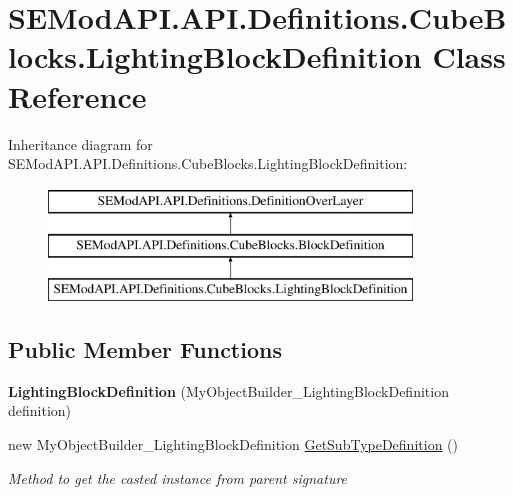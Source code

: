 \hypertarget{class_s_e_mod_a_p_i_1_1_a_p_i_1_1_definitions_1_1_cube_blocks_1_1_lighting_block_definition}{}\section{S\+E\+Mod\+A\+P\+I.\+A\+P\+I.\+Definitions.\+Cube\+Blocks.\+Lighting\+Block\+Definition Class Reference}
\label{class_s_e_mod_a_p_i_1_1_a_p_i_1_1_definitions_1_1_cube_blocks_1_1_lighting_block_definition}
Inheritance diagram for S\+E\+Mod\+A\+P\+I.\+A\+P\+I.\+Definitions.\+Cube\+Blocks.\+Lighting\+Block\+Definition\+:\begin{figure}[H]
\begin{center}
\leavevmode
\includegraphics[height=3.000000cm]{class_s_e_mod_a_p_i_1_1_a_p_i_1_1_definitions_1_1_cube_blocks_1_1_lighting_block_definition}
\end{center}
\end{figure}
\subsection*{Public Member Functions}
\begin{DoxyCompactItemize}
\item 
\hypertarget{class_s_e_mod_a_p_i_1_1_a_p_i_1_1_definitions_1_1_cube_blocks_1_1_lighting_block_definition_af2c2840a2c7d075bc03550dc6ce0f77f}{}{\bfseries Lighting\+Block\+Definition} (My\+Object\+Builder\+\_\+\+Lighting\+Block\+Definition definition)\label{class_s_e_mod_a_p_i_1_1_a_p_i_1_1_definitions_1_1_cube_blocks_1_1_lighting_block_definition_af2c2840a2c7d075bc03550dc6ce0f77f}

\item 
new My\+Object\+Builder\+\_\+\+Lighting\+Block\+Definition \hyperlink{class_s_e_mod_a_p_i_1_1_a_p_i_1_1_definitions_1_1_cube_blocks_1_1_lighting_block_definition_a875ec602dfda49acdd19188d75d6eafe}{Get\+Sub\+Type\+Definition} ()
\begin{DoxyCompactList}\small\item\em Method to get the casted instance from parent signature \end{DoxyCompactList}\end{DoxyCompactItemize}
